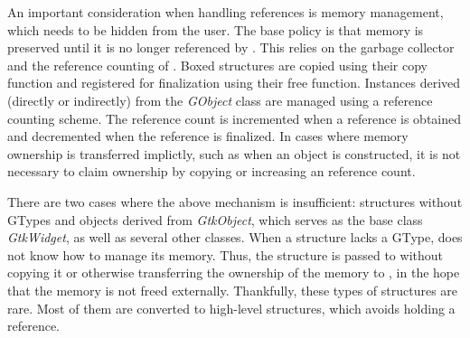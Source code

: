 \documentclass[article]{jss}
\begin{document}
An important consideration when handling references is memory
management, which needs to be hidden from the  user. The
base policy is that memory is preserved until it is no longer
referenced by . This relies on the  garbage
collector and the reference counting of . 
Boxed structures are copied using their copy function and
registered for finalization using their free function. Instances
derived (directly or indirectly) from the \emph{GObject} class are
managed using a reference counting scheme. The reference count is
incremented when a reference is obtained and decremented when the
reference is finalized.  In cases where memory ownership is
transferred implictly, such as when an object is constructed, it is
not necessary to claim ownership by copying or increasing an reference
count.

There are two cases where the above mechanism is insufficient: 
structures without GTypes and objects derived from \emph{GtkObject}, which serves as the base class \emph{GtkWidget}, as well as several other  classes.
When a structure lacks a GType,  does not know how to
manage its memory. 
Thus, the structure is passed to  without copying it or
otherwise
transferring the ownership of the memory to , in the hope
that the
memory is not freed externally. Thankfully, these types of structures
are rare.
Most of them are converted to high-level 
structures, 
which avoids holding a reference. 
\end{document}
